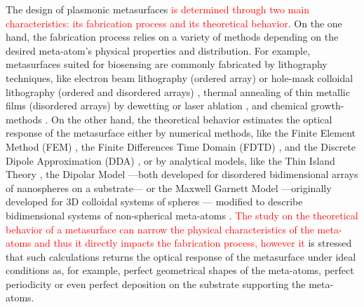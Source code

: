 The design of plasmonic metasurfaces \textcolor{red}{is determined through two main characteristics: its fabrication process and its theoretical behavior}. On the one hand, the fabrication process relies on a variety of methods depending on the desired meta-atom's physical properties and distribution. For example, metasurfaces suited for biosensing are commonly  fabricated by lithography techniques, like electron beam lithography (ordered array) or hole-mask colloidal lithography  (ordered and disordered arrays) \cite{estevez_trends_2014}, thermal annealing of thin metallic films (disordered arrays) by dewetting \cite{qiu_dual_2020} or laser ablation \cite{meng_anisotropic_2015}, and chemical growth-methods \cite{estevez_trends_2014,kabashin_plasmonic_2009}. On the other hand, the theoretical behavior estimates the optical response of the metasurface either by numerical methods, like the Finite Element Method (FEM) \cite{feuz_improving_2010}, the Finite Differences Time Domain (FDTD) \cite{qiu_differential_2015}, and the Discrete Dipole Approximation (DDA) \cite{meng_anisotropic_2015}, or by analytical models, like the Thin Island Theory \cite{svedendahl_refractometric_2014,bedeaux_optical_2004}, the Dipolar Model \cite{barrera1991optical} ---both developed for disordered bidimensional arrays of nanospheres on a substrate--- or the Maxwell Garnett Model ---originally developed for 3D colloidal systems of spheres \cite{sihvola_electromagnetic_2008}--- modified to describe bidimensional systems of non-spherical meta-atoms \cite{oates_characterization_2011,kabashin_plasmonic_2009,moirangthem_enhanced_2012}. \textcolor{red}{The study on the theoretical behavior of a metasurface can narrow the physical characteristics of the meta-atoms and thus it directly impacts the fabrication process, however it} is stressed that such calculations returns the optical response of the metasurface under ideal conditions as, for example, perfect geometrical shapes of the meta-atoms, perfect periodicity or even perfect deposition on the substrate supporting the meta-atoms.

